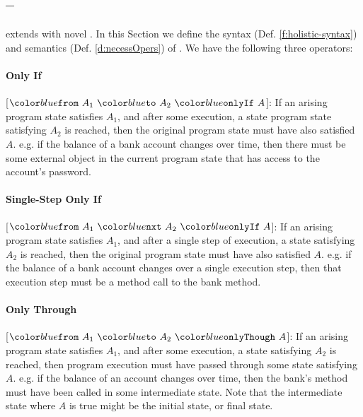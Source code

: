 \subsection{\Chainmail -- \NecessitySpecifications}
\label{s:holistic-guarantees}

\Chainmail extends \SpecO with novel 
.
In this Section we define the syntax (Def. \ref{f:holistic-syntax}) and semantics (Def. \ref{d:necessOpers})
of
\emph{\NecessitySpecifications}.
We have the following three operators:






\paragraph{Only If}
[$\onlyIf{A_1}{A_2}{A}$]: If an arising program state satisfies $A_1$, and after some execution, a state program state satisfying $A_2$ is reached, 
then the original program state must have also satisfied $A$.
e.g. if the balance of a bank account changes over time, then there must be some external object in the current 
program state that has access to the account's password.

\paragraph{Single-Step Only If}
[$\onlyIfSingle{A_1}{A_2}{A}$]: If an arising program state satisfies $A_1$, and after a single step of execution, a state satisfying $A_2$ is reached, 
then the original program state must have also satisfied $A$.
e.g. if the balance of a bank account changes over a single execution step, then that execution step must be a method call to the bank  method.

\paragraph{Only Through}
[$\onlyThrough{A_1}{A_2}{A}$]: If an arising program state satisfies $A_1$, and after some execution, a state satisfying $A_2$ is reached, then program execution must have passed through some state satisfying $A$.
e.g. if the balance of an account changes over time, then the bank's  method must have been called 
in some intermediate state. Note 
that the intermediate state where $A$ is true might be the initial state,
or final state.

